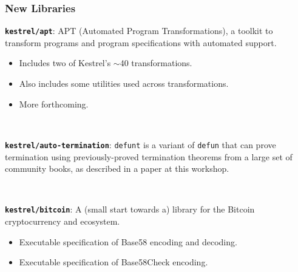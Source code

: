 \documentclass{beamer}
\newcommand{\code}[1]{\texttt{#1}}
\newcommand{\bookpath}[1]{\textbf{\code{#1}}}
\newcommand{\newlibtitle}{\frametitle{New Libraries}}
\begin{document}













\begin{frame}

\newlibtitle

\bookpath{kestrel/apt}:
APT (Automated Program Transformations),
a toolkit
to transform programs and program specifications with automated support.
\begin{itemize}
\item
Includes two of Kestrel's $\sim$40 transformations.
\item
Also includes some utilities used across transformations.
\item
More forthcoming.
\end{itemize}

\

\bookpath{kestrel/auto-termination}:
\code{defunt} is a variant of \code{defun} that can prove termination
using previously-proved termination theorems from a large set of
community books, as described in a paper at this workshop.

\

\bookpath{kestrel/bitcoin}:
A (small start towards a) library for the Bitcoin cryptocurrency and ecosystem.
\begin{itemize}
\item
Executable specification of Base58 encoding and decoding.
\item
Executable specification of Base58Check encoding.
\end{itemize}

\end{frame}
\end{document}
